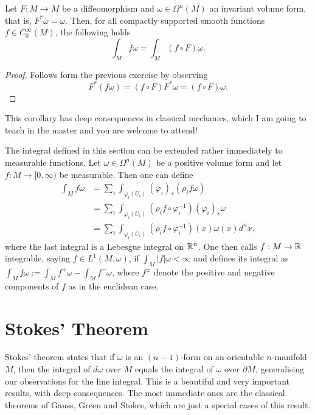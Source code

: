 \begin{corollary}
  Let $F:M\to M$ be a diffeomorphism and $\omega\in\Omega^n(M)$ an invariant volume form, that is, $F^*\omega =\omega$.
  Then, for all compactly supported smooth functions $f\in C^\infty_0(M)$, the following holds
  \begin{equation}
    \int_M f\omega = \int_M (f\circ F)\omega.
  \end{equation}
\end{corollary}
\begin{proof}
  Follows form the previous exercise by observing
  \begin{equation}
    F^*(f\omega) = (f\circ F) F^*\omega = (f\circ F)\omega.
  \end{equation}
\end{proof}

This corollary has deep consequences in classical mechanics, which I am going to teach in the master and you are welcome to attend!

\begin{remark}
  The integral defined in this section can be extended rather immediately to measurable functions.
  Let $\omega\in\Omega^n(M)$ be a positive volume form and let $f:M\to[0,\infty)$ be measurable.
  Then one can define
  \begin{align}
    \int_M f \omega
     & = \sum_i \int_{\varphi_i(U_i)} (\varphi_i)_*(\rho_i f\omega)                      \\
     & = \sum_i \int_{\varphi_i(U_i)} (\rho_i f \circ\varphi_i^{-1}) (\varphi_i)_*\omega \\
     & = \sum_i \int_{\varphi_i(U_i)} (\rho_i f \circ\varphi_i^{-1})(x) \omega(x) d^n x,
  \end{align}
  where the last integral is a Lebesgue integral on $\mathbb{R}^n$.
  One then calls $f:M\to \mathbb{R}$ integrable, saying $f\in L^1(M,\omega)$, if $\int_M|f|\omega < \infty$ and defines its integral as $\int_M f\omega := \int_M f^+\omega - \int_M f^-\omega$, where $f^\pm$ denote the positive and negative components of $f$ as in the euclidean case.
\end{remark}

\section{Stokes' Theorem}

Stokes' theorem states that if $\omega$ is an $(n-1)$-form on an orientable $n$-manifold $M$, then the integral of $d\omega$ over $M$ equals the integral of $\omega$ over $\partial M$, generalising our observations for the line integral.
This is a beautiful and very important results, with deep consequences. The most immediate ones are the classical theorems of Gauss, Green and Stokes, which are just a special cases of this result.

